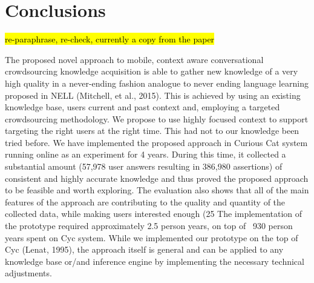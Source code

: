 % 
\chapter{Conclusions}
\label{chapter:conclusions}

\hl{re-paraphrase, re-check, currently a copy from the paper}

The proposed novel approach to mobile, context aware conversational crowdsourcing knowledge acquisition is able to gather new knowledge of a very high quality in a never-ending fashion analogue to never ending language learning proposed in NELL (Mitchell, et al., 2015). This is achieved by using an existing knowledge base, users current and past context and, employing a targeted crowdsourcing methodology. We propose to use highly focused context to support targeting the right users at the right time. This had not to our knowledge been tried before. We have implemented the proposed approach in Curious Cat system running online as an experiment for 4 years. During this time, it collected a substantial amount (57,978 user answers resulting in 386,980 assertions) of consistent and highly accurate knowledge and thus proved the proposed approach to be feasible and worth exploring. The evaluation also shows that all of the main features of the approach are contributing to the quality and quantity of the collected data, while making users interested enough (25%
The implementation of the prototype required approximately 2.5 person years, on top of ~930 person years spent on Cyc system. While we implemented our prototype on the top of Cyc (Lenat, 1995), the approach itself is general and can be applied to any knowledge base or/and inference engine by implementing the necessary technical adjustments. 
